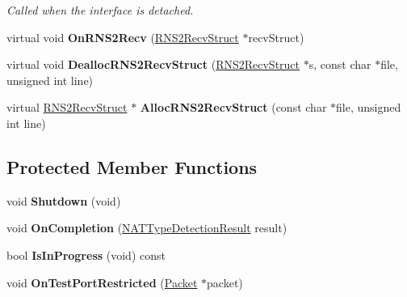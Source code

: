 \begin{DoxyCompactItemize}
\begin{DoxyCompactList}\small\item\em Called when the interface is detached. \end{DoxyCompactList}\item 
\hypertarget{class_rak_net_1_1_nat_type_detection_client_a4c1a4c5d2046edc07650cc145a350307}{virtual void {\bfseries On\-R\-N\-S2\-Recv} (\hyperlink{struct_rak_net_1_1_r_n_s2_recv_struct}{R\-N\-S2\-Recv\-Struct} $\ast$recv\-Struct)}\label{class_rak_net_1_1_nat_type_detection_client_a4c1a4c5d2046edc07650cc145a350307}

\item 
\hypertarget{class_rak_net_1_1_nat_type_detection_client_a97b70de251a33e3e521ec97ca57b145b}{virtual void {\bfseries Dealloc\-R\-N\-S2\-Recv\-Struct} (\hyperlink{struct_rak_net_1_1_r_n_s2_recv_struct}{R\-N\-S2\-Recv\-Struct} $\ast$s, const char $\ast$file, unsigned int line)}\label{class_rak_net_1_1_nat_type_detection_client_a97b70de251a33e3e521ec97ca57b145b}

\item 
\hypertarget{class_rak_net_1_1_nat_type_detection_client_a7f36b00a72c2d70ebac0ca237536de6c}{virtual \hyperlink{struct_rak_net_1_1_r_n_s2_recv_struct}{R\-N\-S2\-Recv\-Struct} $\ast$ {\bfseries Alloc\-R\-N\-S2\-Recv\-Struct} (const char $\ast$file, unsigned int line)}\label{class_rak_net_1_1_nat_type_detection_client_a7f36b00a72c2d70ebac0ca237536de6c}

\end{DoxyCompactItemize}
\subsection*{Protected Member Functions}
\begin{DoxyCompactItemize}
\item 
\hypertarget{class_rak_net_1_1_nat_type_detection_client_abc40b67463aae54d82ea8340c624ed5e}{void {\bfseries Shutdown} (void)}\label{class_rak_net_1_1_nat_type_detection_client_abc40b67463aae54d82ea8340c624ed5e}

\item 
\hypertarget{class_rak_net_1_1_nat_type_detection_client_ab70c358552e489f76e89bcc2c075522d}{void {\bfseries On\-Completion} (\hyperlink{namespace_rak_net_a81848fd95488939c0b3e217209f31139}{N\-A\-T\-Type\-Detection\-Result} result)}\label{class_rak_net_1_1_nat_type_detection_client_ab70c358552e489f76e89bcc2c075522d}

\item 
\hypertarget{class_rak_net_1_1_nat_type_detection_client_a4b1ae71f70647e7c0c56092ebf5571c1}{bool {\bfseries Is\-In\-Progress} (void) const }\label{class_rak_net_1_1_nat_type_detection_client_a4b1ae71f70647e7c0c56092ebf5571c1}

\item 
\hypertarget{class_rak_net_1_1_nat_type_detection_client_a7cf588f11751c2b99e05a45b7ed166a8}{void {\bfseries On\-Test\-Port\-Restricted} (\hyperlink{struct_rak_net_1_1_packet}{Packet} $\ast$packet)}\label{class_rak_net_1_1_nat_type_detection_client_a7cf588f11751c2b99e05a45b7ed166a8}

\end{DoxyCompactItemize}
